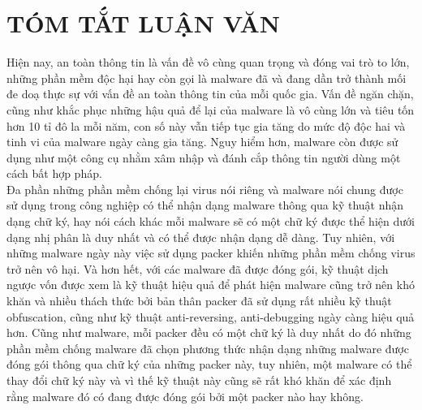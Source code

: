 
\newpage
\chapter{TÓM TẮT LUẬN VĂN}

\setlength\parindent{0pt}
\hspace{0.5cm}Hiện nay, an toàn thông tin là vấn đề vô cùng quan trọng và đóng vai trò to lớn, những phần mềm độc hại hay còn gọi là malware đã và đang dần trở thành mối đe doạ thực sự với vấn đề an toàn thông tin của mỗi quốc gia. Vấn đề ngăn chặn, cũng như khắc phục những hậu quả để lại của malware là vô cùng lớn và tiêu tốn hơn 10 tỉ đô la mỗi năm, con số này vẫn tiếp tục gia tăng do mức độ độc hai và tinh vi của malware ngày càng gia tăng. Nguy hiểm hơn, malware còn được sử dụng như một công cụ nhằm xâm nhập và đánh cắp thông tin người dùng một cách bất hợp pháp.\\  

\hspace{0.5cm}Đa phần những phần mềm chống lại virus nói riêng và malware nói chung được sử dụng trong công nghiệp có thể nhận dạng malware thông qua kỹ thuật nhận dạng chữ ký, hay nói cách khác mỗi malware sẽ có một chữ ký được thể hiện dưới dạng nhị phân là duy nhất và có thể được nhận dạng dễ dàng. Tuy nhiên, với những malware ngày này việc sử dụng packer khiến những phần mềm chống virus trở nên vô hại. Và hơn hết, với các malware đã được đóng gói, kỹ thuật dịch ngược vốn được xem là kỹ thuật hiệu quả để phát hiện malware cũng trở nên khó khăn và nhiều thách thức bởi bản thân packer đã sử dụng rất nhiều kỹ thuật obfuscation, cũng như kỹ thuật anti-reversing, anti-debugging ngày càng hiệu quả hơn. Cũng như malware, mỗi packer đều có một chữ ký là duy nhất do đó những phần mềm chống malware đã chọn phương thức nhận dạng những malware được đóng gói thông qua chữ ký của những packer này, tuy nhiên, một malware có thể thay đổi chữ ký này và vì thế kỹ thuật này cũng sẽ rất khó khăn để xác định rằng malware đó có đang được đóng gói bởi một packer nào hay không.\\

